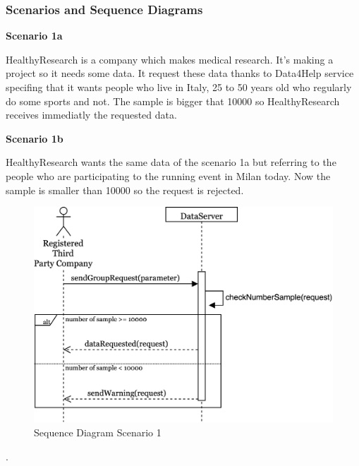 \documentclass[../main.tex]{subfiles}
\begin{document}
	\subsubsection{Scenarios and Sequence Diagrams}
		\begin{minipage}{\textwidth}
			{\bf Scenario 1a}
			\vspace{3mm}

			HealthyResearch is a company which makes medical research. It's making a project so it needs some data. It request these data thanks to Data4Help service specifing that it wants people who live in Italy, 25 to 50 years old who regularly do some sports and not. The sample is bigger that 10000 so HealthyResearch receives immediatly the requested data.
			\vspace{5mm}
		\end{minipage}
		\begin{minipage}{\textwidth}
			{\bf Scenario 1b}
			\vspace{3mm}

			HealthyResearch wants the same data of the scenario 1a but referring to the people who are participating to the running event in Milan today. Now the sample is smaller than 10000 so the request is rejected.
			\vspace{5mm}
		\end{minipage}
		\begin{figure}[H]
			\centering
			\includegraphics[scale=.08]{images/sequenceDiagram1.png}
			\caption{Sequence Diagram Scenario 1 \label{fig:Sequence Diagram Scenario 1}}
		\end{figure}
		\begin{minipage}{\textwidth}
			. 
		\end{minipage}
\end{document}
